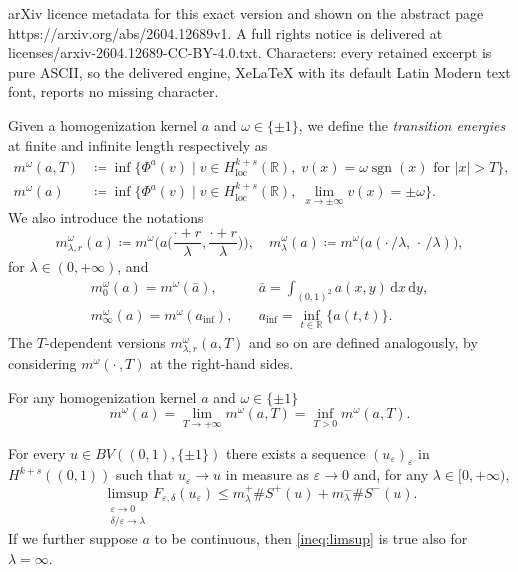 \documentclass[10pt,a4paper]{amsart}
\newcommand{\R}{\mathbb{R}}
\newcommand{\abs}[1]{\left|#1\right|}
\newcommand{\del}{\delta}
\newcommand{\de}{\mathrm{d}}
\newcommand{\e}{\varepsilon}
\newcommand{\sgn}{\operatorname{sgn}}
\begin{document}
arXiv licence metadata for this exact version and shown on the abstract page https://arxiv.org/abs/2604.12689v1. A full rights notice is delivered at licenses/arxiv-2604.12689-CC-BY-4.0.txt. Characters: every retained excerpt is pure ASCII, so the delivered engine, XeLaTeX with its default Latin Modern text font, reports no missing character.
\begin{Definition}
\label{def:transition_energies}
Given a homogenization kernel $a$ and $\omega\in \{\pm 1\}$, we define the \emph{transition energies} at finite and infinite length respectively as
    \begin{align*}
        m^\omega(a,T) &\coloneqq \inf \big\{\Phi^{a}(v)\;\big|\; v\in H^{k+s}_{\operatorname{loc}}(\R), \; v(x) = \omega \sgn(x)  \text{ for } \abs{x} > T\big\},\\
         m^{\omega}(a)  &\coloneqq \inf \big\{\Phi^{a}(v)\;\big|\; v\in H^{k+s}_{\operatorname{loc}}(\R), \; \lim_{x\to \pm\infty}v(x) = \pm \omega \big\}.
    \end{align*}
We also introduce the notations
\begin{equation*}
    m_{\lambda,r}^{\omega}(a)\coloneqq m^\omega\Big(a\Big(\frac{\cdot+r}{\lambda},\frac{\cdot+r}{\lambda}\Big)\Big), \quad m_\lambda^{\omega}(a)\coloneqq m^\omega\big(a(\cdot\,/\lambda,\, \cdot\,/\lambda)\big),
\end{equation*}
 for $\lambda \in (0,+\infty)$, and
 \begin{equation*}
\begin{split}
    m^\omega_0(a)=m^\omega(\bar a), \quad  &\bar a=\int_{(0,1)^2}a(x,y)\,\de x\,\de y,\\
    m^\omega_\infty(a)=m^\omega(a_{\inf}),\quad  &a_{\inf}=\inf_{t\in \R}\{a(t,t)\}.
\end{split}
\end{equation*}
The $T$-dependent versions $m_{\lambda,r}^{\omega}(a, T)$ and so on are defined analogously, by considering $m^\omega(\cdot\,, T)$ at the right-hand sides.
\end{Definition}

\begin{Corollary}\label{coroll:min_equivalence}
For any homogenization kernel $a$ and $\omega\in \{\pm 1\}$
    \[m^{\omega}(a) = \lim_{T\rightarrow +\infty} m^{\omega}(a,T) = \inf_{T>0} m^{\omega}(a,T).\]
\end{Corollary}

\begin{Theorem}
    For every $u \in BV((0,1), \{\pm 1\})$ there exists a sequence $(u_\e)_{\e}$ in $H^{k+s}((0,1))$ such that $u_\e \to u$ in measure as $\e \to 0$ and, for any $\lambda\in [0,+\infty)$,
    \begin{equation}
    \label{ineq:limsup}
        \limsup_{\substack{\e\to 0 \\ \del/\e\to\lambda}} F_{\e,\del}(u_\e) \leq m^+_\lambda\#S^+(u) + m^-_\lambda\# S^-(u).
    \end{equation}
    If we further suppose $a$ to be continuous, then \eqref{ineq:limsup} is true also for $\lambda=\infty$.
\end{Theorem}
\end{document}
